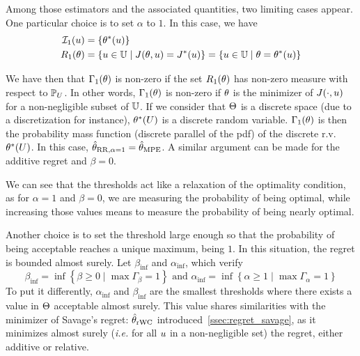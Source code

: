 \documentclass[../../Main_ManuscritThese.tex]{subfiles}
\begin{document}
  
  Among those estimators and the associated quantities, two limiting cases appear. One particular choice is to set $\alpha$ to $1$. In this case, we have
\begin{align}
  \mathcal{I}_{1}(u) &= \{\theta^*(u)\} \\
  R_1(\theta) &= \left\{u\in\mathbb{U} \mid J(\theta, u) = J^*(u)\right\} = \left\{u\in\mathbb{U} \mid \theta = \theta^*(u)\right\}
\end{align}

We have then that $\Gamma_1(\theta)$ is non-zero if the set $R_1(\theta)$ has non-zero measure with respect to $\mathbb{P}_{U}$. In other words, $\Gamma_1(\theta)$ is non-zero if $\theta$ is the minimizer of $J(\cdot,u)$ for a non-negligible subset of $\mathbb{U}$.
If we consider that $\Theta$ is a discrete space (due to a discretization for instance), $\theta^*(U)$ is a discrete random variable. $\Gamma_1(\theta)$ is then the probability mass function (discrete parallel of the pdf) of the discrete r.v.\ $\theta^*(U)$.
In this case, $\hat{\theta}_{\mathrm{RR, \alpha=1}}= \hat{\theta}_{\mathrm{MPE}}$.
A similar argument can be made for the additive regret and $\beta=0$.

We can see that the thresholds act like a relaxation of the optimality condition, as for $\alpha=1$ and $\beta=0$, we are measuring the probability of being optimal, while increasing those values means to measure the probability of being nearly optimal.


Another choice is to set the threshold large enough so that the probability of being acceptable reaches a unique maximum, being $1$. In this situation, the regret is bounded almost surely.
Let $\beta_{\inf{}}$ and $\alpha_{\inf{}}$, which verify
\begin{equation}
  \beta_{\inf{}}=\inf \left\{\beta \geq 0 \mid \max \Gamma_{\beta} = 1\right\} \text{ and }\alpha_{\inf{}}= \inf \left\{\alpha \geq 1 \mid \max \Gamma_{\alpha} = 1\right\}
\end{equation}
To put it differently, $\alpha_{\inf{}}$ and $\beta_{\inf{}}$ are the smallest thresholds where there exists a value in $\Theta$ acceptable almost surely. This value shares similarities with the minimizer of Savage's regret: $\hat{\theta}_{\mathrm{rWC}}$ introduced~\cref{ssec:regret_savage}, as it minimizes almost surely (\emph{i.e.} for all $u$ in a non-negligible set) the regret, either additive or relative.

\end{document}
